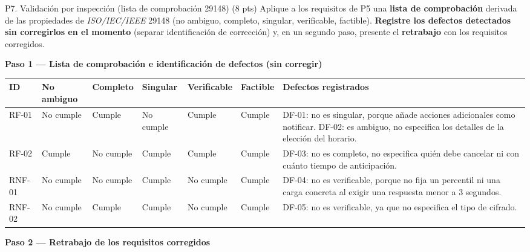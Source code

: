 \documentclass[11pt,a4paper,oneside]{article}
\begin{document}
	\newpage
	
	\begin{tarea}{P7. Validaci\'on por inspecci\'on (lista de comprobaci\'on 29148) \hfill (8 pts)}
		Aplique a los requisitos de P5 una \textbf{lista de comprobaci\'on} derivada de las propiedades de \textit{ISO/IEC/IEEE} 29148 (no ambiguo, completo, singular, verificable, factible). \textbf{Registre los defectos detectados sin corregirlos en el momento} (separar identificaci\'on de correcci\'on) y, en un segundo paso, presente el \textbf{retrabajo} con los requisitos corregidos.
	\end{tarea}
	
	\vspace{10pt}
	
	\textbf{Paso 1 --- Lista de comprobaci\'on e identificaci\'on de defectos (sin corregir)}
	
	\begin{center}\footnotesize
		\begin{tabularx}{\linewidth}{|L{1.2cm}|L{1.5cm}|L{1.3cm}|L{1.3cm}|L{1.5cm}|L{1.2cm}|X|}
			\hline
			\textbf{ID} & \textbf{No ambiguo} & \textbf{Completo} & \textbf{Singular} & \textbf{Verificable} & \textbf{Factible} & \textbf{Defectos registrados}\\
			\hline
			RF-01 & No cumple & Cumple & No cumple & Cumple & Cumple & DF-01: no es singular, porque a\~nade acciones adicionales como notificar. DF-02: es ambiguo, no especifica los detalles de la elecci\'on del horario.\\
			\hline
			RF-02 & Cumple & No cumple & Cumple & Cumple & Cumple & DF-03: no es completo, no especifica qui\'en debe cancelar ni con cu\'anto tiempo de anticipaci\'on.\\
			\hline
			RNF-01 & No cumple & No cumple & Cumple & No cumple & Cumple & DF-04: no es verificable, porque no fija un percentil ni una carga concreta al exigir una respuesta menor a 3 segundos.\\
			\hline
			RNF-02 & No cumple & Cumple & Cumple & No cumple & Cumple & DF-05: no es verificable, ya que no especifica el tipo de cifrado.\\
			\hline
		\end{tabularx}
	\end{center}
	
	\vspace{10pt}
	
	\textbf{Paso 2 --- Retrabajo de los requisitos corregidos}
	
\end{document}
